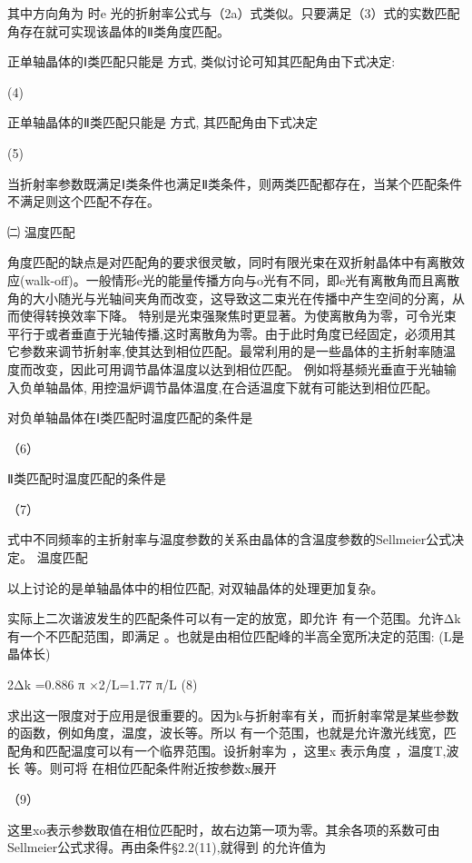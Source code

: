 其中方向角为 时e 光的折射率公式与（2a）式类似。只要满足（3）式的实数匹配角存在就可实现该晶体的Ⅱ类角度匹配。

正单轴晶体的Ⅰ类匹配只能是 方式,   类似讨论可知其匹配角由下式决定:

                     (4)                                      

正单轴晶体的Ⅱ类匹配只能是  方式, 其匹配角由下式决定

               (5)                                  

当折射率参数既满足Ⅰ类条件也满足Ⅱ类条件，则两类匹配都存在，当某个匹配条件不满足则这个匹配不存在。

    ㈡  温度匹配

角度匹配的缺点是对匹配角的要求很灵敏，同时有限光束在双折射晶体中有离散效应(walk-off)。一般情形e光的能量传播方向与o光有不同，即e光有离散角而且离散角的大小随光与光轴间夹角而改变，这导致这二束光在传播中产生空间的分离，从而使得转换效率下降。 特别是光束强聚焦时更显著。为使离散角为零，可令光束平行于或者垂直于光轴传播,这时离散角为零。由于此时角度已经固定，必须用其它参数来调节折射率,使其达到相位匹配。最常利用的是一些晶体的主折射率随温度而改变，因此可用调节晶体温度以达到相位匹配。 例如将基频光垂直于光轴输入负单轴晶体, 用控温炉调节晶体温度,在合适温度下就有可能达到相位匹配。

对负单轴晶体在Ⅰ类匹配时温度匹配的条件是

                                                     （6）

Ⅱ类匹配时温度匹配的条件是

                                 （7）

式中不同频率的主折射率与温度参数的关系由晶体的含温度参数的Sellmeier公式决定。
温度匹配

以上讨论的是单轴晶体中的相位匹配, 对双轴晶体的处理更加复杂。

实际上二次谐波发生的匹配条件可以有一定的放宽，即允许 有一个范围。允许Δk有一个不匹配范围，即满足 。也就是由相位匹配峰的半高全宽所决定的范围: (L是晶体长)

2Δk =0.886 π ×2/L=1.77 π/L                                      (8)

求出这一限度对于应用是很重要的。因为k与折射率有关，而折射率常是某些参数的函数，例如角度，温度，波长等。所以 有一个范围，也就是允许激光线宽，匹配角和匹配温度可以有一个临界范围。设折射率为 ，这里x 表示角度 ，温度T,波长 等。则可将 在相位匹配条件附近按参数x展开

                         （9）

这里xo表示参数取值在相位匹配时，故右边第一项为零。其余各项的系数可由Sellmeier公式求得。再由条件§2.2(11),就得到 的允许值为

